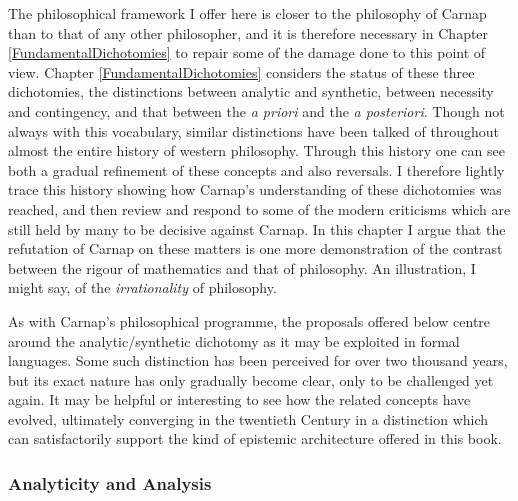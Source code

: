 The philosophical framework I offer here is closer to the philosophy
of Carnap than to that of any other philosopher, and it is therefore
necessary in Chapter \ref{FundamentalDichotomies} to repair some of
the damage done to this point of view.
Chapter \ref{FundamentalDichotomies} considers the status of these three dichotomies, the
distinctions between analytic and synthetic, between necessity and
contingency, and that between the {\it a priori} and the {\it a posteriori}.
Though not always with this vocabulary, similar distinctions have been
talked of throughout almost the entire history of western philosophy.
Through this history one can see both a gradual refinement of these
concepts and also reversals.
I therefore lightly trace this history showing how Carnap's
understanding of these dichotomies was reached, and then review and
respond to some of the modern criticisms which are still held by many
to be decisive against Carnap.
In this chapter I argue that the refutation of Carnap on these matters
is one more demonstration of the contrast between the rigour of
mathematics and that of philosophy.
An illustration, I might say, of the {\it irrationality} of philosophy.

As with Carnap's philosophical programme, the proposals offered below centre around the analytic/synthetic dichotomy as it may be exploited in formal languages.
Some such distinction has been perceived for over two thousand years, but its exact nature has only gradually become clear, only to be challenged yet again.
It may be helpful or interesting to see how the related concepts have evolved, ultimately converging in the twentieth Century in a distinction which can satisfactorily support the kind of epistemic architecture offered in this book.

\subsubsection{Analyticity and Analysis}

